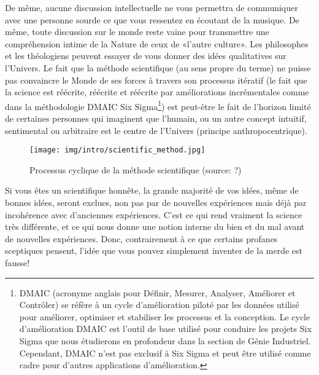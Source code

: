 	De même, aucune discussion intellectuelle ne vous permettra de communiquer avec une personne sourde ce que vous ressentez en \'ecoutant de la musique. De même, toute discussion sur le monde reste vaine pour  transmettre une compr\'ehension intime de la Nature de ceux de «l'autre culture». Les philosophes et les th\'eologiens peuvent essayer de vous donner des id\'ees qualitatives sur l'Univers. Le fait que la m\'ethode scientifique (au sens propre du terme) ne puisse pas convaincre le Monde de ses forces à travers son processus it\'eratif (le fait que la science est r\'e\'ecrite, r\'e\'ecrite et r\'e\'ecrite par am\'eliorations incr\'ementales comme dans la m\'ethodologie DMAIC Six Sigma\footnote{DMAIC (acronyme anglais pour D\'efinir, Mesurer, Analyser, Am\'eliorer et Contrôler) se r\'efère à un cycle d'am\'elioration pilot\'e par les donn\'ees utilis\'e pour am\'eliorer, optimiser et stabiliser les processus et la conception. Le cycle d'am\'elioration DMAIC est l'outil de base utilis\'e pour conduire les projets Six Sigma que nous \'etudierons en profondeur dans la section de G\'enie Industriel. Cependant, DMAIC n'est pas exclusif à Six Sigma et peut être utilis\'e comme cadre pour d'autres applications d'am\'elioration.}) est peut-être le fait de l'horizon limit\'e de certaines personnes qui imaginent que l'humain, ou un autre concept intuitif, sentimental ou arbitraire est le centre de l'Univers (principe anthropocentrique).
	\begin{figure}[H]
		\centering
		\texttt{[image: img/intro/scientific\_method.jpg]}
		\caption[Processus cyclique de la méthode scientifique]{Processus cyclique de la méthode scientifique (source: ?)}
	\end{figure}
	
	\begin{tcolorbox}[title=Remarque,colframe=black,arc=10pt]
	Si vous êtes un scientifique honnête, la grande majorité de vos idées, même de bonnes idées, seront exclues, non pas par de nouvelles expériences mais déjà par incohérence avec d'anciennes expériences. C'est ce qui rend vraiment la science très différente, et ce qui nous donne une notion interne du bien et du mal avant de nouvelles expériences. Donc, contrairement à ce que certains profanes sceptiques pensent, l'idée que vous pouvez simplement inventer de la merde est fausse!
	\end{tcolorbox}
	
